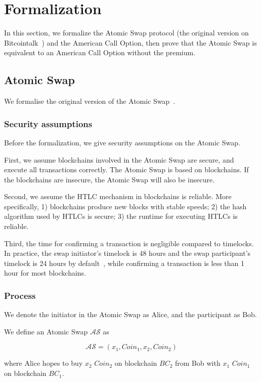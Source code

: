 \section{Formalization}
\label{sec:formalization}

In this section, we formalize the Atomic Swap protocol (the original version on Bitcointalk~\cite{nolan2013alt}) and the American Call Option,
then prove that the Atomic Swap is equivalent to an American Call Option without the premium.





\subsection{Atomic Swap}

We formalise the original version of the Atomic Swap~\cite{nolan2013alt}.

\subsubsection{Security assumptions}

Before the formalization, we give security assumptions on the Atomic Swap.

First, we assume blockchains involved in the Atomic Swap are secure, and execute all transactions correctly.
The Atomic Swap is based on blockchains.
If the blockchains are insecure, the Atomic Swap will also be insecure.

Second, we assume the HTLC mechanism in blockchains is reliable.
More specifically,
1) blockchains produce new blocks with stable speeds;
2) the hash algorithm used by HTLCs is secure;
3) the runtime for executing HTLCs is reliable.


Third, the time for confirming a transaction is negligible compared to timelocks.
In practice, the swap initiator's timelock is 48 hours and the swap participant's timelock is 24 hours by default~\cite{nolan2013alt}, while confirming a transaction is less than 1 hour for most blockchains.


\subsubsection{Process}

We denote the initiator in the Atomic Swap as Alice, and the participant as Bob.

\begin{definition}
We define an Atomic Swap $\mathcal{AS}$ as

$$\mathcal{AS} = (x_1, Coin_1, x_2, Coin_2)$$

where Alice hopes to buy $x_2$ $Coin_2$ on blockchain $BC_2$ from Bob with $x_1$ $Coin_1$ on blockchain $BC_1$.
\end{definition}

